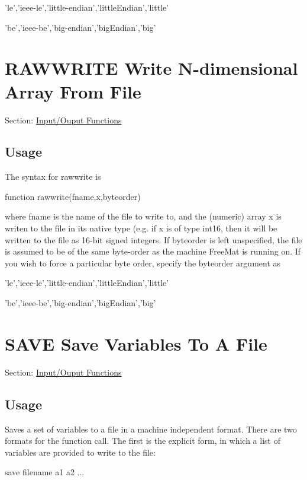 \begin{DoxyItemize}
\item {\ttfamily 'le','ieee-\/le','little-\/endian','little\-Endian','little'}  
\item {\ttfamily 'be','ieee-\/be','big-\/endian','big\-Endian','big'}  
\end{DoxyItemize}\hypertarget{io_rawwrite}{}\section{R\-A\-W\-W\-R\-I\-T\-E Write N-\/dimensional Array From File}\label{io_rawwrite}
Section\-: \hyperlink{sec_io}{Input/\-Ouput Functions} \hypertarget{vtkwidgets_vtkxyplotwidget_Usage}{}\subsection{Usage}\label{vtkwidgets_vtkxyplotwidget_Usage}
The syntax for {\ttfamily rawwrite} is \begin{DoxyVerb}   function rawwrite(fname,x,byteorder)
\end{DoxyVerb}
 where {\ttfamily fname} is the name of the file to write to, and the (numeric) array {\ttfamily x} is writen to the file in its native type (e.\-g. if {\ttfamily x} is of type {\ttfamily int16}, then it will be written to the file as 16-\/bit signed integers. If {\ttfamily byteorder} is left unspecified, the file is assumed to be of the same byte-\/order as the machine {\ttfamily Free\-Mat} is running on. If you wish to force a particular byte order, specify the {\ttfamily byteorder} argument as 
\begin{DoxyItemize}
\item {\ttfamily 'le','ieee-\/le','little-\/endian','little\-Endian','little'}  
\item {\ttfamily 'be','ieee-\/be','big-\/endian','big\-Endian','big'}  
\end{DoxyItemize}\hypertarget{io_save}{}\section{S\-A\-V\-E Save Variables To A File}\label{io_save}
Section\-: \hyperlink{sec_io}{Input/\-Ouput Functions} \hypertarget{vtkwidgets_vtkxyplotwidget_Usage}{}\subsection{Usage}\label{vtkwidgets_vtkxyplotwidget_Usage}
Saves a set of variables to a file in a machine independent format. There are two formats for the function call. The first is the explicit form, in which a list of variables are provided to write to the file\-: \begin{DoxyVerb}  save filename a1 a2 ...
\end{DoxyVerb}
